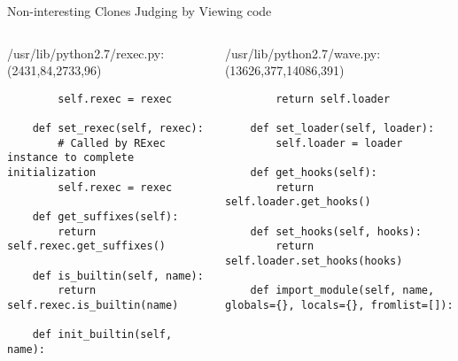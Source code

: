 \begin{frame}[shrink=30,fragile]{Non-interesting Clones Judging by Viewing code}

\lstset{
    breaklines=true,
    language=Python
}

\begin{columns}
\begin{column}[t]{0.48\textwidth}
/usr/lib/python2.7/rexec.py:(2431,84,2733,96)
\begin{lstlisting}
        self.rexec = rexec

    def set_rexec(self, rexec):
        # Called by RExec instance to complete initialization
        self.rexec = rexec

    def get_suffixes(self):
        return self.rexec.get_suffixes()

    def is_builtin(self, name):
        return self.rexec.is_builtin(name)

    def init_builtin(self, name):
 
\end{lstlisting}
\end{column}

\begin{column}[t]{0.48\textwidth}
/usr/lib/python2.7/wave.py:(13626,377,14086,391)
\begin{lstlisting}
        return self.loader

    def set_loader(self, loader):
        self.loader = loader

    def get_hooks(self):
        return self.loader.get_hooks()

    def set_hooks(self, hooks):
        return self.loader.set_hooks(hooks)

    def import_module(self, name, globals={}, locals={}, fromlist=[]):
\end{lstlisting}

\end{column}
\end{columns}

\end{frame}


